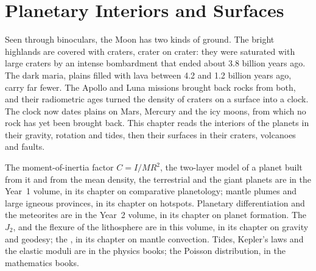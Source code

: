 \chapter{Planetary Interiors and Surfaces}\label{ch:b3:planetary-interiors-surfaces}

Seen through binoculars, the Moon has two kinds of ground. The bright
highlands are covered with craters, crater on crater: they were saturated
with large craters by an intense bombardment that ended about 3.8 billion
years ago. The dark maria, plains filled with lava between 4.2 and 1.2
billion years ago, carry far fewer. The Apollo and Luna
missions brought back rocks from both, and their radiometric ages turned
the density of craters on a surface into a clock. The clock now dates
plains on Mars, Mercury and the icy moons, from which no rock has yet been
brought back. This chapter reads the interiors of the planets in their
gravity, rotation and tides, then their surfaces in their craters,
volcanoes and faults.

\begin{recall}
The moment-of-inertia factor $C = I/MR^2$, the two-layer model of a planet
built from it and from the mean density, the terrestrial and the giant
planets are in the Year~1 volume, in its chapter on comparative
planetology; mantle plumes and large igneous provinces, in its chapter on
hotspots. Planetary differentiation and the meteorites are in the Year~2
volume, in its chapter on planet formation. The 
$J_2$,  and the flexure of the lithosphere are in this
volume, in its chapter on gravity and geodesy; the , in its
chapter on mantle convection. Tides, Kepler's laws and the elastic moduli
are in the physics books; the Poisson distribution, in the mathematics
books.
\end{recall}

